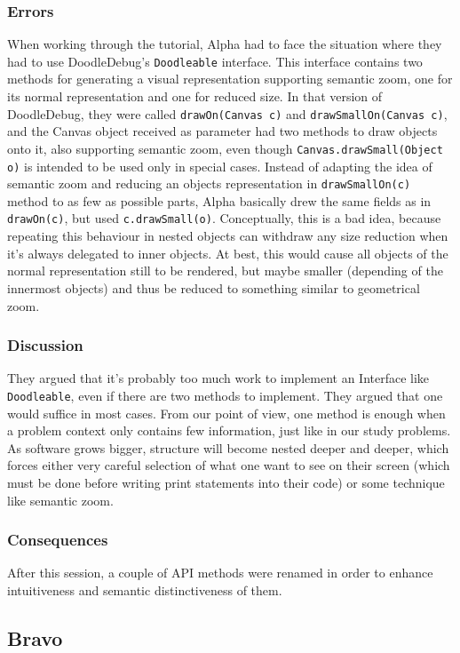 \documentclass{acm_proc_article-sp}
\begin{document}
\subsubsection{Errors}
When working through the tutorial, Alpha had to face the situation where they had to use DoodleDebug's \verb.Doodleable. interface. This interface contains two methods for generating a visual representation supporting semantic zoom, one for its normal representation and one for reduced size. In that version of DoodleDebug, they were called \verb.drawOn(Canvas c). and \verb.drawSmallOn(Canvas c)., and the Canvas object received as parameter had two methods to draw objects onto it, also supporting semantic zoom, even though \verb-Canvas.drawSmall(Object o)- is intended to be used only in special cases. Instead of adapting the idea of semantic zoom and reducing an objects representation in \verb.drawSmallOn(c). method to as few as possible parts, Alpha basically drew the same fields as in \verb.drawOn(c)., but used \verb-c.drawSmall(o)-. Conceptually, this is a bad idea, because repeating this behaviour in nested objects can withdraw any size reduction when it's always delegated to inner objects. At best, this would cause all objects of the normal representation still to be rendered, but maybe smaller (depending of the innermost objects) and thus be reduced to something similar to geometrical zoom.
\subsubsection{Discussion}
They argued that it's probably too much work to implement an Interface like \verb.Doodleable., even if there are two methods to implement. They argued that one would suffice in most cases. From our point of view, one method is enough when a problem context only contains few information, just like in our study problems. As software grows bigger, structure will become nested deeper and deeper, which forces either very careful selection of what one want to see on their screen (which must be done before writing print statements into their code) or some technique like semantic zoom.
\subsubsection{Consequences}
After this session, a couple of API methods were renamed in order to enhance intuitiveness and semantic distinctiveness of them.
\\

\subsection{Bravo}
\end{document}
